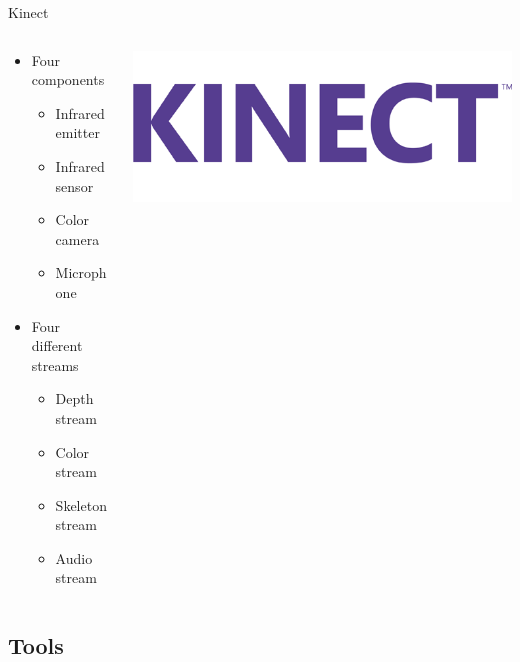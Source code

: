 \documentclass{beamer}
\begin{document}
\begin{frame}{Kinect}
\begin{columns}[T]
    \begin{column}{.5\textwidth}
 \begin{itemize}
  \item Four components
   \begin{itemize}
    \item Infrared emitter
    \item Infrared sensor
    \item Color camera
    \item Microphone
   \end{itemize}
  \item Four different streams
  \begin{itemize}
   \item Depth stream
   \item Color stream
   \item Skeleton stream
   \item Audio stream
  \end{itemize}
 \end{itemize}
    \end{column}
    \begin{column}{.5\textwidth}  
    \includegraphics[scale=0.25]{kinect.png}
    \end{column}
  \end{columns}
\end{frame}

\subsection{Tools}
\end{document}
